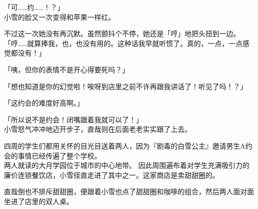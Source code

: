 「可……约……！？」\\

小雪的脸又一次变得和苹果一样红。

不过这一次她没有再沉默。虽然颤抖个不停，她还是「哼」地把头扭到一边。\\

「哼……就算捧我，也，也没有用的。这种话我早就听惯了。真的，一点，一点感觉都没有！」

「咦，但你的表情不是开心得要死吗？」

「想也知道是你的幻觉啦！唉呀到店里之前不许再跟我讲话了！听见了吗！？」

「这约会的难度好高啊。」

「所以说不是约会！闭嘴跟着我就可以了！」\\

小雪怒气冲冲地迈开步子，直哉则在后面老老实实跟了上去。

四周的学生们都用关怀的目光目送着两人，因为『剧毒的白雪公主』邀请男生A约会的事情已经传遍了整个学校。\\

两人就读的大月学园位于城市的中心地带。
因此周围遍布着对学生充满吸引力的廉价连锁餐饮店，小雪径直走进了其中之一。这家商店是卖甜甜圈的。

直哉倒也不排斥甜甜圈，便跟着小雪也点了甜甜圈和咖啡的组合，然后两人面对面坐进了店里的双人桌。\\

